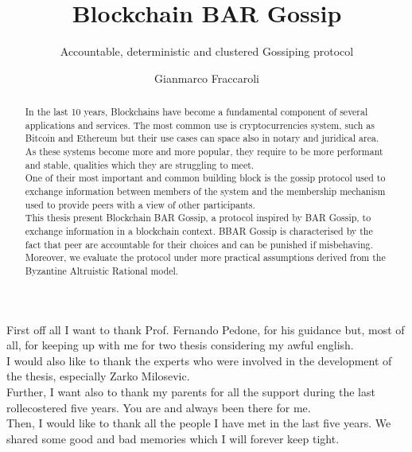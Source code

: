 \documentclass[mscthesis]{usiinfthesis}
\title{Blockchain BAR Gossip} %
\subtitle{Accountable, deterministic and clustered Gossiping protocol} %
\author{Gianmarco Fraccaroli} %
\begin{document}
\maketitle %

\frontmatter %

\begin{abstract}
In the last 10 years, Blockchains have become a fundamental component of several applications and services. The most common use is cryptocurrencies system, such as Bitcoin and Ethereum but their use cases can space also in notary and juridical area. As these systems become more and more popular, they require to be more performant and stable, qualities which they are struggling to meet. \\
One of their most important and common building block is the gossip protocol used to exchange information between members of the system and the membership mechanism used to provide peers with a view of other participants. \\
This thesis present Blockchain BAR Gossip, a protocol inspired by BAR Gossip, to exchange information in a blockchain context. BBAR Gossip is characterised by the fact that peer are accountable for their choices and can be punished if misbehaving. Moreover, we evaluate the protocol under more practical assumptions derived from the Byzantine Altruistic Rational model.
\end{abstract}



\begin{acknowledgements}
First off all I want to thank Prof. Fernando Pedone, for his guidance but, most of all, for keeping up with me for two thesis considering my awful english. \\
I would also like to thank the experts who were involved in the development of the thesis, especially Zarko Milosevic. \\
Further, I want also to thank  my parents for all the support during the last rollecostered five years. You are and always been there for me. \\
Then, I would like to thank all the people I have met in the last five years. We shared some good and bad memories which I will forever keep tight. \\

\end{acknowledgements}
\end{document}
